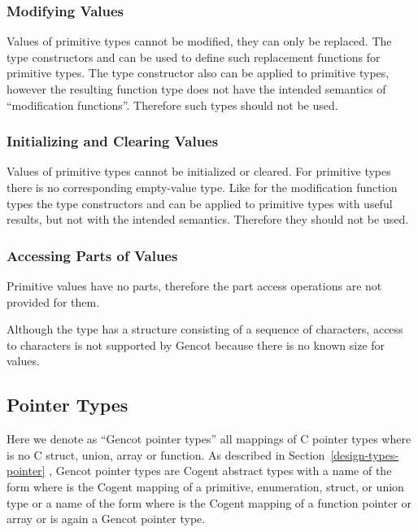 \subsubsection{Modifying Values}

Values of primitive types cannot be modified, they can only be replaced. The type constructors  and 
can be used to define such replacement functions for primitive types. The type constructor  also
can be applied to primitive types, however the resulting function type does not have the
intended semantics of ``modification functions''. Therefore such types should not be used.

\subsubsection{Initializing and Clearing Values}

Values of primitive types cannot be initialized or cleared. For primitive types there is no corresponding empty-value type.
Like for the modification function types the type constructors
 and  can be applied to primitive types with useful results, but not with the intended semantics.
Therefore they should not be used.

\subsubsection{Accessing Parts of Values}

Primitive values have no parts, therefore the part access operations are not provided for them.

Although the type  has a structure consisting of a sequence of characters, access to characters is not supported
by Gencot because there is no known size for  values.

\subsection{Pointer Types}
\label{design-operations-pointer}

Here we denote as ``Gencot pointer types'' all mappings of C pointer types  where  is no C struct, union, array or function.
As described in Section~\ref{design-types-pointer} , Gencot pointer types are 
Cogent abstract types with a name of the form  where  is the Cogent mapping of a primitive, enumeration, struct, or union 
type  or a name of the form  where  is the Cogent mapping of a function pointer or array or  is again a 
Gencot pointer type.

